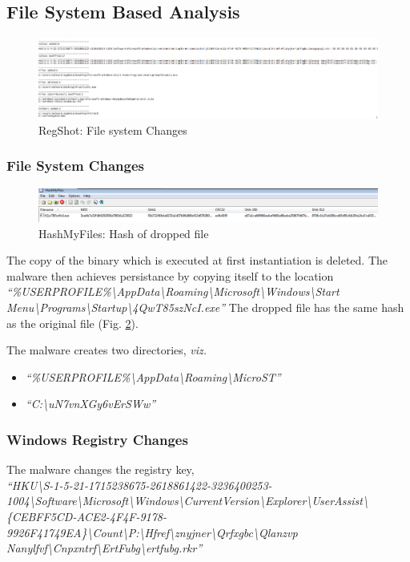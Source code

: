\documentclass[10pt,a4paper]{article}
\begin{document}
		\subsection{File System Based Analysis}
				\begin{figure}[!htbp]%
					\centering
					\includegraphics[width=\columnwidth]{pics/regshot.png}
					\caption{RegShot: File system Changes}
					\label{regshot}
				\end{figure}
				\subsubsection{File System Changes}
					\begin{figure}[!htbp]%
						\centering
						\includegraphics[width=\columnwidth]{pics/dropped.png}
						\caption{HashMyFiles: Hash of dropped file}
						\label{dropped}
					\end{figure}
					The copy of the binary which is executed at first instantiation is deleted.
					The malware then achieves persistance by copying itself to the location
					\textit{``\%USERPROFILE\%\textbackslash AppData\textbackslash Roaming\textbackslash Microsoft\textbackslash Windows\textbackslash Start Menu\textbackslash Programs\textbackslash Startup\textbackslash 4QwT85szNcI.exe''}
					The dropped file has the same hash as the original file (Fig. \ref{dropped}).

					The malware creates two directories, \textit{viz.}
					\begin{itemize}
						\item \textit{``\%USERPROFILE\%\textbackslash AppData\textbackslash Roaming\textbackslash MicroST''}
						\item \textit{``C:\textbackslash uN7vnXGy6vErSWw''}
					\end{itemize}

				\subsubsection{Windows Registry Changes}
					The malware changes the registry key,\\
						\textit{``HKU\textbackslash S-1-5-21-1715238675-2618861422-3236400253-1004\textbackslash Software\textbackslash Microsoft\textbackslash Windows\textbackslash CurrentVersion\textbackslash Explorer\textbackslash UserAssist\textbackslash\{CEBFF5CD-ACE2-4F4F-9178-9926F41749EA\}\textbackslash Count\textbackslash P:\textbackslash Hfref\textbackslash znyjner\textbackslash Qrfxgbc\textbackslash Qlanzvp Nanylfvf\textbackslash Cnpxntrf\textbackslash ErtFubg\textbackslash ertfubg.rkr''}
\end{document}
